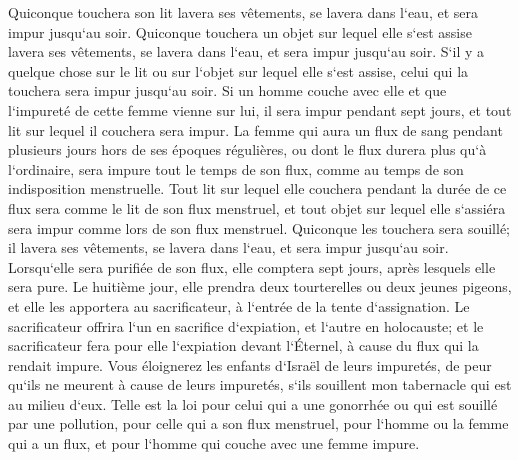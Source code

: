 \verse Quiconque touchera son lit lavera ses vêtements, se lavera dans l`eau, et sera impur jusqu`au soir. 
\verse Quiconque touchera un objet sur lequel elle s`est assise lavera ses vêtements, se lavera dans l`eau, et sera impur jusqu`au soir. 
\verse S`il y a quelque chose sur le lit ou sur l`objet sur lequel elle s`est assise, celui qui la touchera sera impur jusqu`au soir. 
\verse Si un homme couche avec elle et que l`impureté de cette femme vienne sur lui, il sera impur pendant sept jours, et tout lit sur lequel il couchera sera impur. 
\verse La femme qui aura un flux de sang pendant plusieurs jours hors de ses époques régulières, ou dont le flux durera plus qu`à l`ordinaire, sera impure tout le temps de son flux, comme au temps de son indisposition menstruelle. 
\verse Tout lit sur lequel elle couchera pendant la durée de ce flux sera comme le lit de son flux menstruel, et tout objet sur lequel elle s`assiéra sera impur comme lors de son flux menstruel. 
\verse Quiconque les touchera sera souillé; il lavera ses vêtements, se lavera dans l`eau, et sera impur jusqu`au soir. 
\verse Lorsqu`elle sera purifiée de son flux, elle comptera sept jours, après lesquels elle sera pure. 
\verse Le huitième jour, elle prendra deux tourterelles ou deux jeunes pigeons, et elle les apportera au sacrificateur, à l`entrée de la tente d`assignation. 
\verse Le sacrificateur offrira l`un en sacrifice d`expiation, et l`autre en holocauste; et le sacrificateur fera pour elle l`expiation devant l`Éternel, à cause du flux qui la rendait impure. 
\verse Vous éloignerez les enfants d`Israël de leurs impuretés, de peur qu`ils ne meurent à cause de leurs impuretés, s`ils souillent mon tabernacle qui est au milieu d`eux. 
\verse Telle est la loi pour celui qui a une gonorrhée ou qui est souillé par une pollution, 
\verse pour celle qui a son flux menstruel, pour l`homme ou la femme qui a un flux, et pour l`homme qui couche avec une femme impure. 

